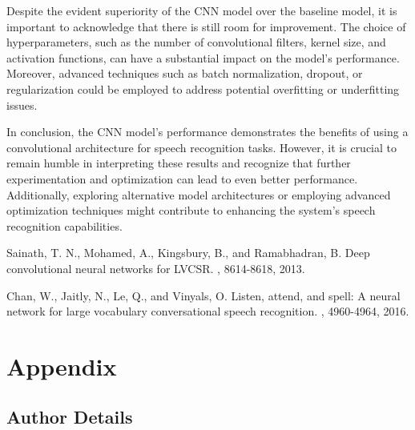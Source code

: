 \documentclass[12pt]{article}
\begin{document}
Despite the evident superiority of the CNN model over the baseline model, it is important to acknowledge that there is still room for improvement. The choice of hyperparameters, such as the number of convolutional filters, kernel size, and activation functions, can have a substantial impact on the model's performance. Moreover, advanced techniques such as batch normalization, dropout, or regularization could be employed to address potential overfitting or underfitting issues.

In conclusion, the CNN model's performance demonstrates the benefits of using a convolutional architecture for speech recognition tasks. However, it is crucial to remain humble in interpreting these results and recognize that further experimentation and optimization can lead to even better performance. Additionally, exploring alternative model architectures or employing advanced optimization techniques might contribute to enhancing the system's speech recognition capabilities.

\begin{thebibliography}{1}




Sainath, T. N., Mohamed, A., Kingsbury, B., and Ramabhadran, B.
\newblock Deep convolutional neural networks for LVCSR.
,
  8614-8618, 2013.

Chan, W., Jaitly, N., Le, Q., and Vinyals, O. 
\newblock Listen, attend, and spell: A neural network for large vocabulary conversational speech recognition.
, 4960-4964, 2016.

\end{thebibliography}

\section{Appendix}

\subsection{Author Details}

\newcommand{\authorOneID}{Student ID: 1223964586}
\newcommand{\authorOneEmail}{\texttt{tpoliset@asu.edu}}

\newcommand{\authorTwoID}{Student ID: 1225886534}
\newcommand{\authorTwoEmail}{\texttt{ysivaraj@asu.edu}}
\end{document}
